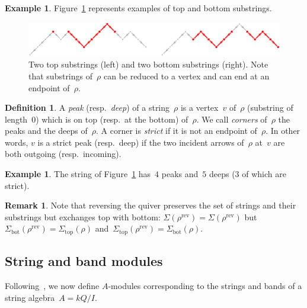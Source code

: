 \documentclass{amsart}
\theoremstyle{definition}
\newtheorem{definition}[theorem]{Definition}
\newtheorem{example}[theorem]{Example}
\newtheorem{remark}[theorem]{Remark}
\newcommand{\fref}[1]{Figure~\ref{#1}} %
\newcommand{\darkblue}{\color{darkblue}} %
\newcommand{\defn}[1]{\textsl{\darkblue #1}} %
\newcommand{\reversed}[1]{#1^{\mathrm{rev}}} %
\renewcommand{\top}{\mathrm{top}} %
\newcommand{\bottom}{\mathrm{bot}} %
\begin{document}
\begin{example}
\fref{fig:exmTopBottom} represents examples of top and bottom substrings.

\begin{figure}[t]
	\capstart
	\centerline{\includegraphics[scale=.3]{exmTopBottom}}
	\caption{Two top substrings (left) and two bottom substrings (right). Note that substrings of~$\rho$ can be reduced to a vertex and can end at an endpoint of~$\rho$.}
	\label{fig:exmTopBottom}
\end{figure}
\end{example}

\begin{definition}
A \defn{peak} (resp.~\defn{deep}) of a string~$\rho$ is a vertex~$v$ of~$\rho$ (substring of length~$0$) which is on top (resp.~at the bottom) of~$\rho$.
We call \defn{corners} of~$\rho$ the peaks and the deeps of~$\rho$.
A corner is \defn{strict} if it is not an endpoint of~$\rho$.
In other words, $v$ is a strict peak (resp.~deep) if the two incident arrows of~$\rho$ at~$v$ are both outgoing (resp.~incoming).
\end{definition}

\begin{example}
The string of \fref{fig:exmTopBottom} has~$4$ peaks and~$5$ deeps ($3$ of which are strict).
\end{example}

\begin{remark}
\label{rem:reverseStrings}
Note that reversing the quiver preserves the set of strings and their substrings but exchanges top with bottom:
$\Sigma(\reversed{\rho}) = \Sigma(\reversed{\rho})$ but~$\Sigma_\bottom(\reversed{\rho}) = \Sigma_\top(\rho)$ and~$\Sigma_\top(\reversed{\rho}) = \Sigma_\bottom(\rho)$.
\end{remark}

\subsection{String and band modules}
\label{subsec:stringBandModules}

Following~\cite{ButlerRingel}, we now define $A$-modules corresponding to the strings and bands of a string algebra~$A = kQ/I$.
\end{document}
